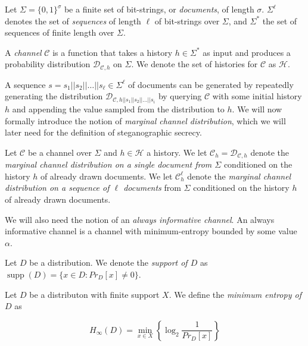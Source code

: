 \begin{definition}
Let $\Sigma = \{0,1\}^\sigma$ be a finite set of bit-strings, or \emph{documents}, of length $\sigma$.
$\Sigma^\ell$ denotes the set of \emph{sequences} of length $\ell$ of bit-strings over $\Sigma$, and $\Sigma^*$ the set of sequences of finite length over $\Sigma$.

A \emph{channel} $\mathcal{C}$ is a function that takes a history $h \in \Sigma^*$ as input and produces a probability distribution $\mathcal{D}_{\mathcal{C},h}$ on $\Sigma$.
We denote the set of histories for $\mathcal{C}$ as $\mathcal{H}$.
\end{definition}

A sequence $s = s_1||s_2||\dots||s_\ell \in \Sigma^\ell$ of documents can be generated by repeatedly generating the distribution $\mathcal{D}_{\mathcal{C},h||s_1||s_2||\dots||s_i}$ by querying $\mathcal{C}$ with some initial history $h$ and appending the value sampled from the distribution to $h$.
We will now formally introduce the notion of \emph{marginal channel distribution}, which we will later need for the definition of steganographic secrecy.

\begin{definition}
Let $\mathcal{C}$ be a channel over $\Sigma$ and $h \in \mathcal{H}$ a history.
We let $\mathcal{C}_h = \mathcal{D}_{\mathcal{C},h}$ denote the \emph{marginal channel distribution on a single document from $\Sigma$} conditioned on the history $h$ of already drawn documents.
We let $\mathcal{C}_h^\ell$ denote the \emph{marginal channel distribution on a sequence of $\ell$ documents} from $\Sigma$ conditioned on the history $h$ of already drawn documents.
\end{definition}

We will also need the notion of an \emph{always informative channel}.
An always informative channel is a channel with minimum-entropy bounded by some value $\alpha$.

\begin{definition}[Support]
Let $D$ be a distribution.
We denote the \emph{support of $D$} as $\mathop{supp}(D) = \{ x \in D \colon Pr_{D}[x] \neq 0 \}$.
\end{definition}

\begin{definition}
Let $D$ be a distributon with finite support $X$.
We define the \emph{minimum entropy of $D$} as

	$$H_{\infty}(D) = \min_{x \in X}\left\{ \log_2 \frac{1}{ Pr_{D}[x] } \right\}$$
\end{definition}

